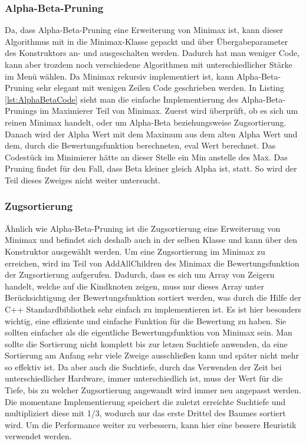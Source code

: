 \documentclass[12pt,a4paper,bibliography=totocnumbered,listof=totocnumbered]{article}
\begin{document}
\subsubsection{Alpha-Beta-Pruning}
Da, dass Alpha-Beta-Pruning eine Erweiterung von Minimax ist, kann dieser Algorithmus mit in die Minimax-Klasse gepackt
und über Übergabeparameter des Konstruktors an- und ausgeschalten werden. Dadurch hat man weniger Code, kann aber trozdem noch 
verschiedene Algorithmen mit unterschiedlicher Stärke im Menü wählen. Da Minimax rekursiv implementiert ist, kann Alpha-Beta-Pruning sehr elegant mit wenigen 
Zeilen Code geschrieben werden. In Listing \ref{lst:AlphaBetaCode} sieht man die einfache Implementierung des Alpha-Beta-Prunings im Maximierer Teil 
von Minimax. Zuerst wird überprüft, ob es sich um reinen Minimax handelt, oder um Alpha-Beta beziehungsweise Zugsortierung. Danach wird der Alpha Wert mit dem
Maximum aus dem alten Alpha Wert und dem, durch die Bewertungsfunktion berechneten, eval Wert berechnet. Das Codestück im Minimierer hätte an dieser Stelle 
ein Min anstelle des Max. Das Pruning findet für den Fall, dass Beta kleiner gleich Alpha ist, statt. So wird der Teil dieses Zweiges nicht weiter untersucht.
\vspace{1em}


\subsubsection{Zugsortierung}
Ähnlich wie Alpha-Beta-Pruning ist die Zugsortierung eine Erweiterung von Minimax und befindet sich deshalb auch in der selben Klasse und kann über den 
Konstruktor ausgewählt werden. 
Um eine Zugsortierung im Minimax zu erreichen, wird im Teil von AddAllChildren des Minimax die Bewertungsfunktion der Zugsortierung aufgerufen.
Dadurch, dass es sich um Array von Zeigern handelt, welche auf die Kindknoten zeigen, muss nur dieses Array unter Berücksichtigung der Bewertungsfunktion
sortiert werden, was durch die Hilfe der C++ Standardbibliothek sehr einfach zu implementieren ist. Es ist hier besonders wichtig, eine effiziente und einfache Funktion für die 
Bewertung zu haben. Sie sollten einfacher als die eigentliche Bewertungsfunktion von Minimax sein. Man sollte die Sortierung nicht komplett bis zur letzen Suchtiefe anwenden, 
da eine Sortierung am Anfang sehr viele Zweige ausschließen kann und später nicht mehr so effektiv ist. Da aber auch die Suchtiefe, durch das Verwenden der Zeit bei 
unterschiedlicher Hardware, immer unterschiedlich ist, muss der Wert für die Tiefe, bis zu welcher Zugsortierung angewandt wird immer neu angepasst werden.
Die momentane Implementierung speichert die zuletzt erreichte Suchtiefe und multipliziert diese mit 1/3, wodurch nur das erste Drittel des Baumes sortiert wird. 
Um die Performance weiter zu verbessern, kann hier eine bessere Heuristik verwendet werden.
\end{document}
